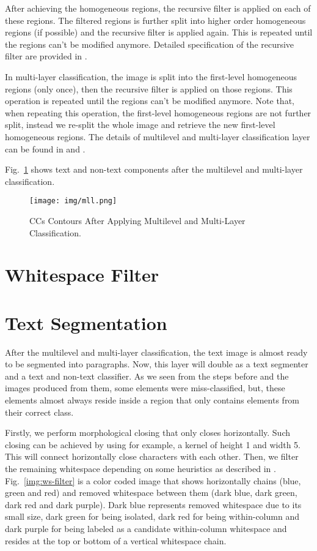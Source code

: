 \documentclass[12pt]{report}
\begin{document}
    After achieving the homogeneous regions, the recursive filter is applied on each of these regions.
    The filtered regions is further split into higher order homogeneous regions (if possible) and the
    recursive filter is applied again. This is repeated until the regions can't be modified anymore.
    Detailed specification of the recursive filter are provided in \cite{mha}.

    In multi-layer classification, the image is split into the first-level homogeneous regions (only once),
    then the recursive filter is applied on those regions. This operation is repeated until the regions
    can't be modified anymore.
    Note that, when repeating this operation, the first-level homogeneous regions are not further split,
    instead we re-split the whole image and retrieve the new first-level homogeneous regions.
    The details of multilevel and multi-layer classification layer can be found in \cite{mhs} and \cite{mha}.

    Fig.~\ref{img:mll} shows text and non-text components after the multilevel and multi-layer classification.

    \begin{figure}[htbp]
        \centerline{\texttt{[image: img/mll.png]}}
        \caption{CCs Contours After Applying Multilevel and Multi-Layer Classification.}
        \label{img:mll}
    \end{figure}

    \section{Whitespace Filter}
    

    \section{Text Segmentation}

    After the multilevel and multi-layer classification, the text image is almost ready to be
    segmented into paragraphs.
    Now, this layer will double as a text segmenter and a text and non-text classifier.
    As we seen from the steps before and the images produced from them, some elements were
    miss-classified, but, these elements almost always reside inside a region that only contains
    elements from their correct class.

    Firstly, we perform morphological closing that only closes horizontally.
    Such closing can be achieved by using for example, a kernel of height 1 and width 5.
    This will connect horizontally close characters with each other.
    Then, we filter the remaining whitespace depending on some heuristics as described in \cite{ws}.
    Fig.~\ref{img:ws-filter} is a color coded image that shows horizontally chains
    (blue, green and red) and removed whitespace between them
    (dark blue, dark green, dark red and dark purple).
    Dark blue represents removed whitespace due to its small size, dark green for being isolated,
    dark red for being within-column and dark purple for being labeled as a candidate within-column
    whitespace and resides at the top or bottom of a vertical whitespace chain.
\end{document}
